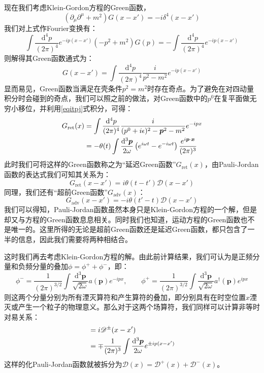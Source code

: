 现在我们考虑Klein-Gordon方程的Green函数，
\begin{equation}
(\partial_\mu\partial^\mu+m^2)G(x-x')=-i\delta^4(x-x')
\end{equation}
我们对上式作Fourier变换有：
\begin{equation}
\int\frac{\mathrm{d}^4p}{(2\pi)^4}e^{-ip(x-x')}(-p^2+m^2)G(p)=-\int\frac{\mathrm{d}^4p}{(2\pi)^4}e^{-ip(x-x')}
\end{equation}
则解得其Green函数通式为：
\begin{equation}
G(x-x')=\int\frac{\mathrm{d}^4p}{(2\pi)^4}\frac{i}{p^2-m^2}e^{-ip(x-x')}
\end{equation}
显而易见，Green函数当满足在壳条件$p^2=m^2$时存在奇点。为了避免在对四动量积分时会碰到的奇点，我们可以照之前的做法，对Green函数中的$p^0$在复平面做无穷小移位，并利用\eqref{eqitpj}式积分，可得：
\begin{align}
G_{\text{ret}}(x)&=\int\frac{\mathrm{d}^4p}{(2\pi)^4}\frac{i}{(p^0+i\epsilon)^2-\boldsymbol{p}^2-m^2}e^{-ipx}\notag\\
&=-
\theta(t)\int\frac{\mathrm{d}^3\boldsymbol{p}}{2\omega}\left(e^{i\omega t}-e^{-i\omega t}\right)\frac{e^{i\boldsymbol{p}\cdot\boldsymbol{x}}}{(2\pi)^3}
\end{align}
此时我们可将这样的Green函数称之为“延迟Green函数”$G_{\text{ret}}(x)$，由Pauli-Jordan函数的表达式我们可知其关系为：
\begin{equation}
G_{\text{ret}}(x-x')=i\theta(t-t')\mathscr{D}(x-x')
\end{equation}
同理，我们还有“超前Green函数”$G_{\text{adv}}(x)$：
\begin{equation}
G_{\text{adv}}(x-x')=-i\theta(t'-t)\mathscr{D}(x-x')
\end{equation}
我们可以得知，Pauli-Jordan函数虽然本身只是Klein-Gordon方程的一个解，但是却又与方程的Green函数息息相关。同时我们也知道，运动方程的Green函数也不是唯一的。这里所得的无论是超前Green函数还是延迟Green函数，都只包含了一半的信息，因此我们需要将两种相结合。

这时我们再去考虑Klein-Gordon方程的解。由此前计算结果，我们可认为是正频分量和负频分量的叠加$\phi=\phi^+ +\phi^-$，即：
\begin{equation}
\phi^- =\frac{1}{(2\pi)^{3/2}}\int\frac{\mathrm{d}^3\boldsymbol{p}}{\sqrt{2\omega}}a(\boldsymbol{p})e^{-ipx},\qquad\phi^+ =\frac{1}{(2\pi)^{3/2}}\int\frac{\mathrm{d}^3\boldsymbol{p}}{\sqrt{2\omega}}a^\dagger(\boldsymbol{p})e^{ipx}
\end{equation}
则这两个分量分别为所有湮灭算符和产生算符的叠加，即分别具有在时空位置$x$湮灭或产生一个粒子的物理意义。那么对于这两个场算符，我们同样可以计算非等时对易关系：
\begin{align}
[\phi^\pm(x),\phi^\mp(x')]&=i\mathscr{D}^\pm(x-x')\notag\\
&=\mp\frac{1}{(2\pi)^3}\int\frac{\mathrm{d}^3\boldsymbol{p}}{2\omega}e^{\pm ip(x-x')}
\end{align}
这样的化Pauli-Jordan函数就被拆分为$\mathscr{D}(x)=\mathscr{D}^+(x) +\mathscr{D}^-(x)$。

